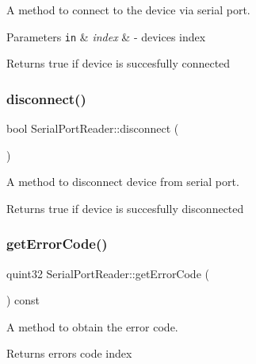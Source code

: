 A method to connect to the device via serial port. 


\begin{DoxyParams}[1]{Parameters}
\mbox{\tt in}  & {\em index} & -\/ device\textquotesingle{}s index \\
\hline
\end{DoxyParams}
\begin{DoxyReturn}{Returns}
true if device is succesfully connected 
\end{DoxyReturn}
\mbox{\label{class_serial_port_reader_a40d30745fd700e05d534b38c4ba4939b}} 
\subsubsection{disconnect()}
{\footnotesize\ttfamily bool Serial\+Port\+Reader\+::disconnect (\begin{DoxyParamCaption}{ }\end{DoxyParamCaption})}



A method to disconnect device from serial port. 

\begin{DoxyReturn}{Returns}
true if device is succesfully disconnected 
\end{DoxyReturn}
\mbox{\label{class_serial_port_reader_a33a6f505ebf902bf3a3f64970c6a7cec}} 
\subsubsection{get\+Error\+Code()}
{\footnotesize\ttfamily quint32 Serial\+Port\+Reader\+::get\+Error\+Code (\begin{DoxyParamCaption}{ }\end{DoxyParamCaption}) const}



A method to obtain the error code. 

\begin{DoxyReturn}{Returns}
error\textquotesingle{}s code index 
\end{DoxyReturn}
\mbox{\label{class_serial_port_reader_a5a919fb6b06f5505de1aababcde045f6}} 
